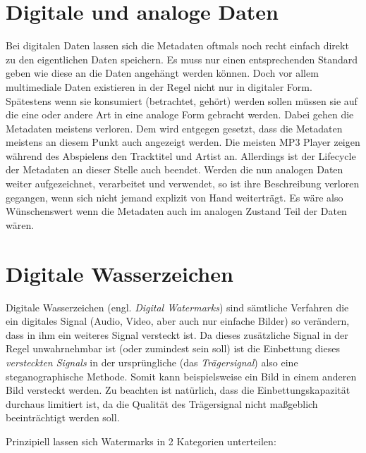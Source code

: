 \section{Digitale und analoge Daten}

Bei digitalen Daten lassen sich die Metadaten oftmals noch recht einfach direkt zu den eigentlichen Daten speichern. Es muss nur einen entsprechenden Standard geben wie diese an die Daten angeh\"angt werden k\"onnen. Doch vor allem multimediale Daten existieren in der Regel nicht nur in digitaler Form. Sp\"atestens wenn sie konsumiert (betrachtet, geh\"ort) werden sollen m\"ussen sie auf die eine oder andere Art in eine analoge Form gebracht werden. Dabei gehen die Metadaten meistens verloren. Dem wird entgegen gesetzt, dass die Metadaten meistens an diesem Punkt auch angezeigt werden. Die meisten MP3 Player zeigen w\"ahrend des Abspielens den Tracktitel und Artist an. Allerdings ist der Lifecycle der Metadaten an dieser Stelle auch beendet. Werden die nun analogen Daten weiter aufgezeichnet, verarbeitet und verwendet, so ist ihre Beschreibung verloren gegangen, wenn sich nicht jemand explizit \glqq{}von Hand\grqq{} weitertr\"agt. Es w\"are also W\"unschenswert wenn die Metadaten auch im analogen Zustand Teil der Daten w\"aren. 

\section{Digitale Wasserzeichen}

Digitale Wasserzeichen (engl. \textit{Digital Watermarks}) sind s\"amtliche Verfahren die ein digitales Signal (Audio, Video, aber auch nur einfache Bilder) so ver\"andern, dass in ihm ein weiteres Signal versteckt ist. Da dieses zus\"atzliche Signal in der Regel unwahrnehmbar ist (oder zumindest sein soll) ist die Einbettung dieses \textit{versteckten Signals} in der urspr\"ungliche (das \textit{Tr\"agersignal}) also eine steganographische Methode.
Somit kann beispielsweise ein Bild in einem anderen Bild versteckt werden. Zu beachten ist nat\"urlich, dass die Einbettungskapazit\"at durchaus limitiert ist, da die Qualit\"at des Tr\"agersignal nicht maßgeblich beeintr\"achtigt werden soll. 

Prinzipiell lassen sich Watermarks in 2 Kategorien unterteilen\cite{arnold2000audio}: 

